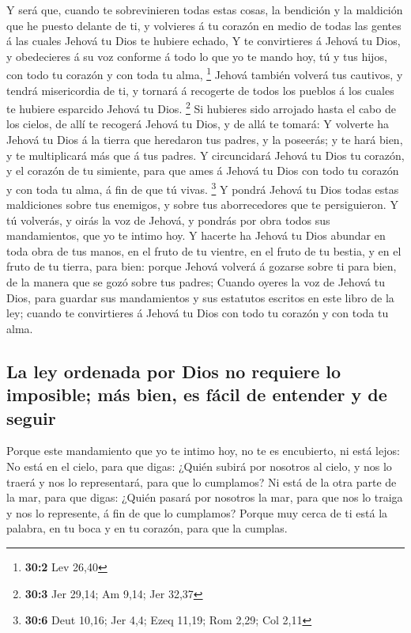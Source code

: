  Y será que, cuando te sobrevinieren todas estas cosas, la
bendición y la maldición que he puesto delante de ti, y volvieres á tu
corazón en medio de todas las gentes á las cuales Jehová tu Dios te
hubiere echado,  Y te convirtieres á Jehová tu Dios, y
obedecieres á su voz conforme á todo lo que yo te mando hoy, tú y tus
hijos, con todo tu corazón y con toda tu alma, \footnote{\textbf{30:2}
  Lev 26,40}  Jehová también volverá tus cautivos, y tendrá
misericordia de ti, y tornará á recogerte de todos los pueblos á los
cuales te hubiere esparcido Jehová tu Dios. \footnote{\textbf{30:3} Jer
  29,14; Am 9,14; Jer 32,37}  Si hubieres sido arrojado
hasta el cabo de los cielos, de allí te recogerá Jehová tu Dios, y de
allá te tomará:  Y volverte ha Jehová tu Dios á la tierra
que heredaron tus padres, y la poseerás; y te hará bien, y te
multiplicará más que á tus padres.  Y circuncidará Jehová tu
Dios tu corazón, y el corazón de tu simiente, para que ames á Jehová tu
Dios con todo tu corazón y con toda tu alma, á fin de que tú vivas.
\footnote{\textbf{30:6} Deut 10,16; Jer 4,4; Ezeq 11,19; Rom 2,29; Col
  2,11}  Y pondrá Jehová tu Dios todas estas maldiciones
sobre tus enemigos, y sobre tus aborrecedores que te persiguieron.
 Y tú volverás, y oirás la voz de Jehová, y pondrás por obra
todos sus mandamientos, que yo te intimo hoy.  Y hacerte ha
Jehová tu Dios abundar en toda obra de tus manos, en el fruto de tu
vientre, en el fruto de tu bestia, y en el fruto de tu tierra, para
bien: porque Jehová volverá á gozarse sobre ti para bien, de la manera
que se gozó sobre tus padres;  Cuando oyeres la voz de
Jehová tu Dios, para guardar sus mandamientos y sus estatutos escritos
en este libro de la ley; cuando te convirtieres á Jehová tu Dios con
todo tu corazón y con toda tu alma.

\hypertarget{la-ley-ordenada-por-dios-no-requiere-lo-imposible-muxe1s-bien-es-fuxe1cil-de-entender-y-de-seguir}{%
\subsection{La ley ordenada por Dios no requiere lo imposible; más bien,
es fácil de entender y de
seguir}\label{la-ley-ordenada-por-dios-no-requiere-lo-imposible-muxe1s-bien-es-fuxe1cil-de-entender-y-de-seguir}}

 Porque este mandamiento que yo te intimo hoy, no te es
encubierto, ni está lejos:  No está en el cielo, para que
digas: ¿Quién subirá por nosotros al cielo, y nos lo traerá y nos lo
representará, para que lo cumplamos?  Ni está de la otra
parte de la mar, para que digas: ¿Quién pasará por nosotros la mar, para
que nos lo traiga y nos lo represente, á fin de que lo cumplamos?
 Porque muy cerca de ti está la palabra, en tu boca y en tu
corazón, para que la cumplas.

